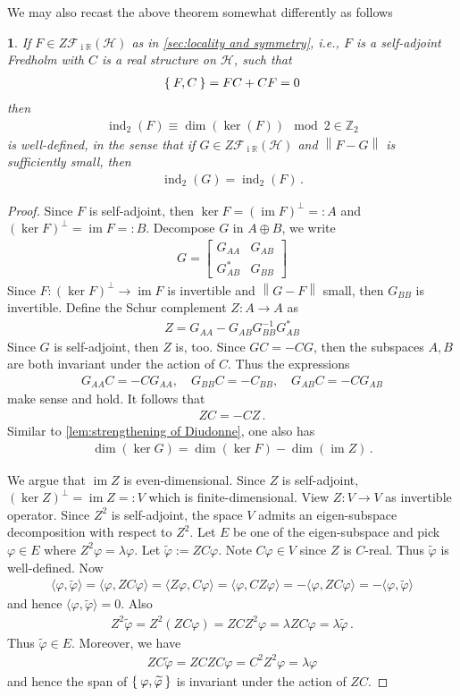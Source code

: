 \documentclass[a4paper,10pt]{article}
\numberwithin{equation}{section}
\theoremstyle{plain}
\newtheorem{thm}{\protect\theoremname}[section]
\theoremstyle{plain}
\theoremstyle{plain}
\theoremstyle{plain}
\theoremstyle{plain}
\theoremstyle{remark}
\theoremstyle{definition}
\theoremstyle{plain}
\providecommand{\theoremname}{Theorem}
\newcommand{\ii}{\operatorname{i}}
\newcommand{\RR}{\mathbb{R}}
\newcommand{\calF}{\mathcal{F}}
\newcommand{\calH}{\mathcal{H}}
\newcommand\norm[1]{\left\lVert#1\right\rVert}
\newcommand{\ip}[2]{\langle #1, #2 \rangle}
\newcommand{\vf}{\varphi}
\newcommand{\findex}{\operatorname{ind}}
\newcommand{\im}{\operatorname{im}}
\newcommand{\eq}[1]{\begin{align*}#1\end{align*}}
\newcommand{\Schur}{Z}
\begin{document}
	
	We may also recast the above theorem somewhat differently as follows
	\begin{thm}\label{thm:ASZ2 index v2}
		If $F\in\Schur\calF_{\ii\RR}\left(\mathcal{H}\right)$ as in \cref{sec:locality and symmetry}, i.e., $F$ is a self-adjoint Fredholm with $C$ is a real structure on $\calH$, such that \eq{\Set{F,C}=FC+CF=0} then \eq{\findex_{2}\left(F\right)\equiv\dim\left(\ker\left(F\right)\right)\mod2\in\mathbb{Z}_{2}} is well-defined, in the sense that if $G\in\Schur\calF_{\ii\RR}\left(\mathcal{H}\right)$
		and $\norm{F-G}$ is sufficiently
		small, then 
		\eq{\findex_2(G)=\findex_2(F)\,.}
	\end{thm}
	
	\begin{proof}
		
		Since $F$ is self-adjoint, then $\ker F=(\im F)^\perp=:A$ and $(\ker F)^\perp=\im F=:B$. Decompose $G$ in $A\oplus B$, we write \eq{G=\begin{bmatrix}G_{AA} & G_{AB} \\ G_{AB}^* & G_{BB}\end{bmatrix}} Since $F:(\ker F)^\perp\to\im F$ is invertible and $\norm{G-F}$ small, then $G_{BB}$ is invertible. Define the Schur complement $\Schur:A\to A$ as \eq{\Schur = G_{AA} - G_{AB} G_{BB}^{-1} G_{AB}^*} Since $G$ is self-adjoint, then $\Schur$ is, too. Since $GC=-CG$, then the subspaces $A,B$ are both invariant under the action of $C$. Thus the expressions \eq{G_{AA}C=-CG_{AA},\quad G_{BB}C=-C_{BB},\quad G_{AB}C=-CG_{AB}} make sense and hold. It follows that \eq{\Schur C=-C\Schur\,.} 
		Similar to \cref{lem:strengthening of Diudonne}, one also has \eq{\dim(\ker G)= \dim(\ker F)-\dim(\im\Schur)\,.}
		
		We argue that $\im \Schur$ is even-dimensional. Since $\Schur$ is self-adjoint, $(\ker \Schur)^\perp=\im \Schur=:V$ which is finite-dimensional. View $\Schur:V\to V$ as invertible operator. Since $\Schur^2$ is self-adjoint, the space $V$ admits an eigen-subspace decomposition with respect to $\Schur^2$. Let $E$ be one of the eigen-subspace and pick $\vf\in E$ where $\Schur^2\vf=\lambda \vf$. Let $\widetilde{\vf}:=\Schur C\vf$. Note $C\vf\in V$ since $\Schur$ is $C$-real. Thus $\widetilde{\vf}$ is well-defined. Now \eq{\ip{\vf}{\widetilde{\vf}}=\ip{\vf}{\Schur C\vf}=\ip{\Schur \vf}{C\vf}=\ip{\vf}{C\Schur\vf}=-\ip{\vf}{\Schur C\vf}=-\ip{\vf}{\widetilde{\vf}}} and hence $\ip{\vf}{\widetilde{\vf}}=0$. Also \eq{\Schur^2 \widetilde{\vf}=\Schur^2(\Schur C\vf)=\Schur C\Schur^2\vf=\lambda \Schur C\vf=\lambda\widetilde{\vf}\,.} 
		Thus $\widetilde{\vf}\in E$. Moreover, we have \eq{\Schur C\widetilde{\vf}=\Schur C\Schur C\vf=C^2\Schur^2\vf=\lambda\vf} and hence the span of $\Set{\vf,\widetilde{\vf}}$ is invariant under the action of $\Schur C$.
		

\end{proof}
\end{document}
